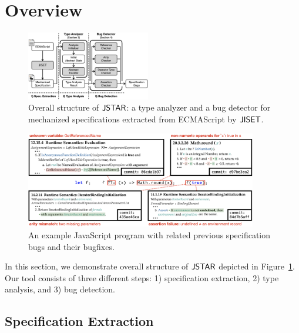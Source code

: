 \section{Overview}\label{sec:overview}

\begin{figure}
  \centering
  \includegraphics[width=0.48\textwidth]{img/overall}
  \vspace*{-1.5em}
  \caption{Overall structure of $\textsf{JSTAR}$: a type analyzer and a bug detector for
  mechanized specifications extracted from ECMAScript by $\textsf{JISET}$.}
  \label{fig:overall}
  \vspace*{-1.5em}
\end{figure}

\begin{figure}[t]
  \centering
  \includegraphics[width=0.9\textwidth]{img/example}
  \vspace*{-1em}
  \caption{An example JavaScript program with related previous specification
  bugs and their bugfixes.}
  \label{fig:example}
\end{figure}

In this section, we demonstrate overall structure of $\textsf{JSTAR}$ depicted in
Figure~\ref{fig:overall}.  Our tool consists of three different steps:
1) specification extraction, 2) type analysis, and 3) bug detection.


\subsection{Specification Extraction}\label{sec:overview-spec-extract}

